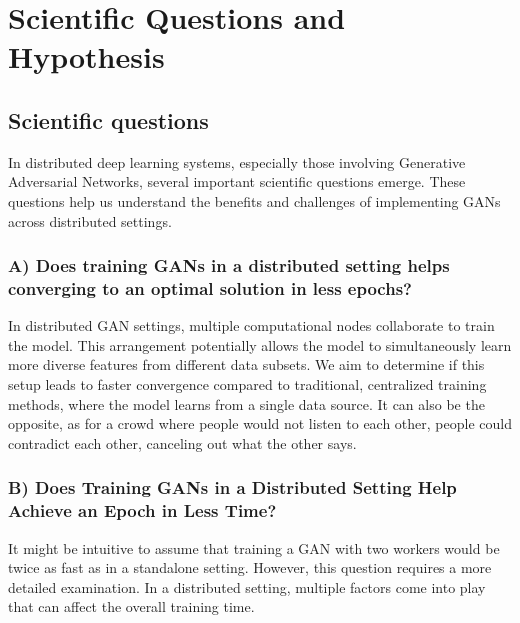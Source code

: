 \chapter{Scientific Questions and Hypothesis}
\section{Scientific questions}
In distributed deep learning systems, especially those involving Generative Adversarial Networks, several important scientific questions emerge. These questions help us understand the benefits and challenges of implementing GANs across distributed settings.

\subsection*{A) Does training GANs in a distributed setting helps converging to an optimal solution in less epochs?} \label{que:a}
In distributed GAN settings, multiple computational nodes collaborate to train the model. This arrangement potentially allows the model to simultaneously learn more diverse features from different data subsets. We aim to determine if this setup leads to faster convergence compared to traditional, centralized training methods, where the model learns from a single data source. It can also be the opposite, as for a crowd where people would not listen to each other, people could contradict each other, canceling out what the other says.


\subsection*{B) Does Training GANs in a Distributed Setting Help Achieve an Epoch in Less Time?} \label{que:b}
It might be intuitive to assume that training a GAN with two workers would be twice as fast as in a standalone setting. However, this question requires a more detailed examination. In a distributed setting, multiple factors come into play that can affect the overall training time.

